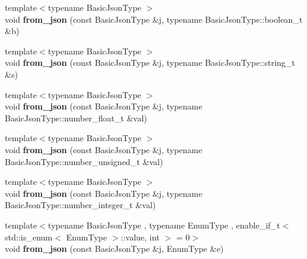 \begin{DoxyCompactItemize}
\item 
{\footnotesize template$<$typename Basic\+Json\+Type $>$ }\\void {\bfseries from\+\_\+json} (const Basic\+Json\+Type \&j, typename Basic\+Json\+Type\+::boolean\+\_\+t \&b)\hypertarget{namespacenlohmann_1_1detail_a58117f225f43d03e3a0a4a6f3d77c9d9}{}\label{namespacenlohmann_1_1detail_a58117f225f43d03e3a0a4a6f3d77c9d9}

\item 
{\footnotesize template$<$typename Basic\+Json\+Type $>$ }\\void {\bfseries from\+\_\+json} (const Basic\+Json\+Type \&j, typename Basic\+Json\+Type\+::string\+\_\+t \&s)\hypertarget{namespacenlohmann_1_1detail_ad74d89f77ada7a57eff38b43d4bf2335}{}\label{namespacenlohmann_1_1detail_ad74d89f77ada7a57eff38b43d4bf2335}

\item 
{\footnotesize template$<$typename Basic\+Json\+Type $>$ }\\void {\bfseries from\+\_\+json} (const Basic\+Json\+Type \&j, typename Basic\+Json\+Type\+::number\+\_\+float\+\_\+t \&val)\hypertarget{namespacenlohmann_1_1detail_a7cb5dd7d46a60e65f9a8e0873b3f7dd8}{}\label{namespacenlohmann_1_1detail_a7cb5dd7d46a60e65f9a8e0873b3f7dd8}

\item 
{\footnotesize template$<$typename Basic\+Json\+Type $>$ }\\void {\bfseries from\+\_\+json} (const Basic\+Json\+Type \&j, typename Basic\+Json\+Type\+::number\+\_\+unsigned\+\_\+t \&val)\hypertarget{namespacenlohmann_1_1detail_ace4d5680ba413d9fd897ccb5d9c61a1c}{}\label{namespacenlohmann_1_1detail_ace4d5680ba413d9fd897ccb5d9c61a1c}

\item 
{\footnotesize template$<$typename Basic\+Json\+Type $>$ }\\void {\bfseries from\+\_\+json} (const Basic\+Json\+Type \&j, typename Basic\+Json\+Type\+::number\+\_\+integer\+\_\+t \&val)\hypertarget{namespacenlohmann_1_1detail_a047d881e611fcac709dc318f730a1732}{}\label{namespacenlohmann_1_1detail_a047d881e611fcac709dc318f730a1732}

\item 
{\footnotesize template$<$typename Basic\+Json\+Type , typename Enum\+Type , enable\+\_\+if\+\_\+t$<$ std\+::is\+\_\+enum$<$ Enum\+Type $>$\+::value, int $>$  = 0$>$ }\\void {\bfseries from\+\_\+json} (const Basic\+Json\+Type \&j, Enum\+Type \&e)\hypertarget{namespacenlohmann_1_1detail_a5440d650150d01e8015133521351b459}{}\label{namespacenlohmann_1_1detail_a5440d650150d01e8015133521351b459}


\end{DoxyCompactItemize}
